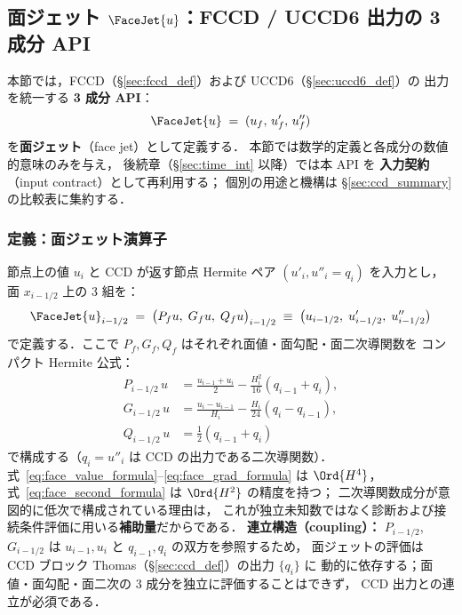 %
%
\subsection{\texorpdfstring{面ジェット $\FaceJet{u}$：FCCD / UCCD6 出力の 3 成分 API}{面ジェット J\_f(u)：FCCD / UCCD6 出力の 3 成分 API}}
\label{sec:face_jet_def}

本節では，FCCD（§\ref{sec:fccd_def}）および UCCD6（§\ref{sec:uccd6_def}）の
出力を統一する \textbf{3 成分 API}：
\[
  \FaceJet{u} \;=\; (u_f,\,u'_f,\,u''_f)
\]
を\textbf{面ジェット}（face jet）として定義する．
本節では数学的定義と各成分の数値的意味のみを与え，
後続章（§\ref{sec:time_int} 以降）では本 API を
\textbf{入力契約}（input contract）として再利用する；
個別の用途と機構は §\ref{sec:ccd_summary} の比較表に集約する．

\subsubsection{定義：面ジェット演算子}
\label{sec:face_jet_formula}

節点上の値 $u_i$ と CCD が返す節点 Hermite ペア $(u'_i, u''_i = q_i)$ を入力とし，
面 $x_{i-1/2}$ 上の 3 組を：
\begin{equation}
  \FaceJet{u}_{i-1/2}
  \;=\;
  \bigl(P_f u,\; G_f u,\; Q_f u\bigr)_{i-1/2}
  \;\equiv\;
  \bigl(u_{i-1/2},\; u'_{i-1/2},\; u''_{i-1/2}\bigr)
  \label{eq:face_jet_def}
\end{equation}
で定義する．ここで $P_f, G_f, Q_f$ はそれぞれ面値・面勾配・面二次導関数を
コンパクト Hermite 公式：
\begin{align}
  P_{i-1/2}\,u &=
  \frac{u_{i-1}+u_i}{2}
  -\frac{H_i^2}{16}(q_{i-1}+q_i), \label{eq:face_value_formula}\\
  G_{i-1/2}\,u &=
  \frac{u_i-u_{i-1}}{H_i}
  -\frac{H_i}{24}(q_i-q_{i-1}), \label{eq:face_grad_formula}\\
  Q_{i-1/2}\,u &=
  \tfrac{1}{2}(q_{i-1}+q_i) \label{eq:face_second_formula}
\end{align}
で構成する（$q_i = u''_i$ は CCD の出力である二次導関数）．
式~\eqref{eq:face_value_formula}–\eqref{eq:face_grad_formula} は $\Ord{H^4}$，
式~\eqref{eq:face_second_formula} は $\Ord{H^2}$ の精度を持つ；
二次導関数成分が意図的に低次で構成されている理由は，
これが独立未知数ではなく診断および接続条件評価に用いる\textbf{補助量}だからである．
\textbf{連立構造（coupling）：}
$P_{i-1/2}$, $G_{i-1/2}$ は $u_{i-1}, u_i$ と $q_{i-1}, q_i$ の双方を参照するため，
面ジェットの評価は CCD ブロック Thomas（§\ref{sec:ccd_def}）の出力 $\{q_i\}$ に
動的に依存する；面値・面勾配・面二次の 3 成分を独立に評価することはできず，
CCD 出力との連立が必須である．

